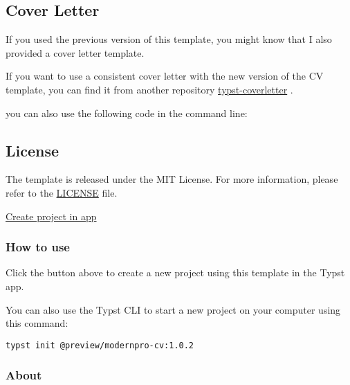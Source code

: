 \subsection{Cover Letter}\label{cover-letter}

If you used the previous version of this template, you might know that I
also provided a cover letter template.

If you want to use a consistent cover letter with the new version of the
CV template, you can find it from another repository
\href{https://github.com/jxpeng98/typst-coverletter}{typst-coverletter}
.

you can also use the following code in the command line:

\begin{Shaded}
\begin{Highlighting}[]
\end{Highlighting}
\end{Shaded}

\subsection{License}\label{license}

The template is released under the MIT License. For more information,
please refer to the
\href{https://github.com/jxpeng98/Typst-CV-Resume/blob/main/LICENSE}{LICENSE}
file.

\href{/app?template=modernpro-cv&version=1.0.2}{Create project in app}

\subsubsection{How to use}\label{how-to-use}

Click the button above to create a new project using this template in
the Typst app.

You can also use the Typst CLI to start a new project on your computer
using this command:

\begin{verbatim}
typst init @preview/modernpro-cv:1.0.2
\end{verbatim}



\subsubsection{About}\label{about}

